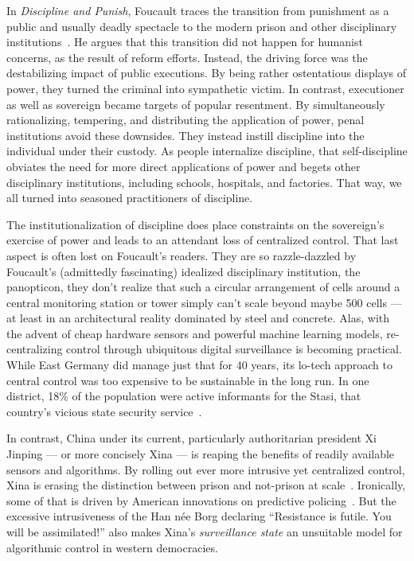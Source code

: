 
In \emph{Discipline and Punish}, Foucault traces the transition from punishment
as a public and usually deadly spectacle to the modern prison and other
disciplinary institutions~\cite{Foucault1979}. He argues that this transition
did not happen for humanist concerns, as the result of reform efforts. Instead,
the driving force was the destabilizing impact of public executions. By being
rather ostentatious displays of power, they turned the criminal into sympathetic
victim. In contrast, executioner as well as sovereign became targets of popular
resentment. By simultaneously rationalizing, tempering, and distributing the
application of power, penal institutions avoid these downsides. They instead
instill discipline into the individual under their custody. As people
internalize discipline, that self-discipline obviates the need for more direct
applications of power and begets other disciplinary institutions, including
schools, hospitals, and factories. That way, we all turned into seasoned
practitioners of discipline.

The institutionalization of discipline does place constraints on the sovereign's
exercise of power and leads to an attendant loss of centralized control. That
last aspect is often lost on Foucault's readers. They are so razzle-dazzled by
Foucault's (admittedly fascinating) idealized disciplinary institution, the
panopticon, they don't realize that such a circular arrangement of cells around
a central monitoring station or tower simply can't scale beyond maybe 500 cells
--- at least in an architectural reality dominated by steel and concrete. Alas,
with the advent of cheap hardware sensors and powerful machine learning models,
re-centralizing control through ubiquitous digital surveillance is becoming
practical. While East Germany did manage just that for 40 years, its lo-tech
approach to central control was too expensive to be sustainable in the long run.
In one district, 18\% of the population were active informants for the Stasi,
that country's vicious state security service~\cite{Kellerhoff2022}.

In contrast, China under its current, particularly authoritarian president Xi
Jinping --- or more concisely Xina --- is reaping the benefits of readily
available sensors and algorithms. By rolling out ever more intrusive yet
centralized control, Xina is erasing the distinction between prison and
not-prison at scale~\cite{Grauer2021,MozurXiaoea2022,SmithIV2016}. Ironically,
some of that is driven by American innovations on predictive
policing~\cite{PerryMcInnisea2013,SmithIV2016,Sprick2019}. But the excessive
intrusiveness of the Han n\'ee Borg declaring ``Resistance is futile. You will
be assimilated!'' also makes Xina's \emph{surveillance state} an unsuitable
model for algorithmic control in western democracies.

